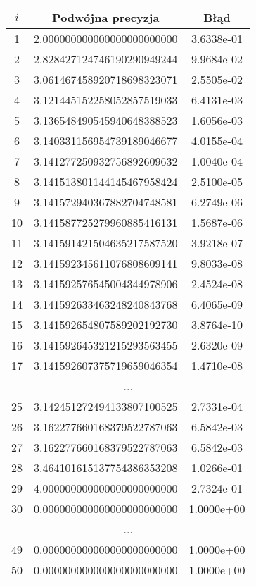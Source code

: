 \documentclass[10pt,wide]{mwart}
\theoremstyle{definition}
\begin{document}
\begin{minipage}[t]{0.5\textwidth}
  \begin{tabular}{|c||c|c||} \hline
    \(i\) & Podwójna precyzja & Błąd \\ \hline
    1 & 2.000000000000000000000000 & 3.6338e-01 \\ \hline
    2 & 2.828427124746190290949244 & 9.9684e-02 \\ \hline
    3 & 3.061467458920718698323071 & 2.5505e-02 \\ \hline
    4 & 3.121445152258052857519033 & 6.4131e-03 \\ \hline
    5 & 3.136548490545940648388523 & 1.6056e-03 \\ \hline
    6 & 3.140331156954739189046677 & 4.0155e-04 \\ \hline
    7 & 3.141277250932756892609632 & 1.0040e-04 \\ \hline
    8 & 3.141513801144145467958424 & 2.5100e-05 \\ \hline
    9 & 3.141572940367882704748581 & 6.2749e-06 \\ \hline
    10 & 3.141587725279960885416131 & 1.5687e-06 \\ \hline
    11 & 3.141591421504635217587520 & 3.9218e-07 \\ \hline
    12 & 3.141592345611076808609141 & 9.8033e-08 \\ \hline
    13 & 3.141592576545004344978906 & 2.4524e-08 \\ \hline
    14 & 3.141592633463248240843768 & 6.4065e-09 \\ \hline
    15 & 3.141592654807589202192730 & 3.8764e-10 \\ \hline
    16 & 3.141592645321215293563455 & 2.6320e-09 \\ \hline
    17 & 3.141592607375719659046354 & 1.4710e-08 \\ \hline
    \multicolumn{3}{|c|}{...} \\ \hline
    25 & 3.142451272494133807100525 & 2.7331e-04 \\ \hline
    26 & 3.162277660168379522787063 & 6.5842e-03 \\ \hline
    27 & 3.162277660168379522787063 & 6.5842e-03 \\ \hline
    28 & 3.464101615137754386353208 & 1.0266e-01 \\ \hline
    29 & 4.000000000000000000000000 & 2.7324e-01 \\ \hline
    30 & 0.000000000000000000000000 & 1.0000e+00 \\ \hline
    \multicolumn{3}{|c|}{...} \\ \hline
    49 & 0.000000000000000000000000 & 1.0000e+00 \\ \hline
    50 & 0.000000000000000000000000 & 1.0000e+00 \\ \hline
  \end{tabular}
\end{minipage}
\end{document}
